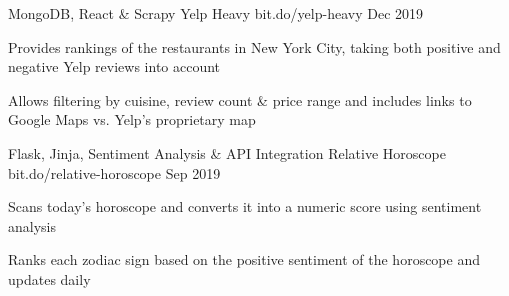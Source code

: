 

\begin{cventries}

 \cventry
    {MongoDB, React \& Scrapy} %
    {Yelp Heavy} %
    {bit.do/yelp-heavy} %
    {Dec 2019} %
    {
      \begin{cvitems} %
        \item {Provides rankings of the restaurants in New York City, taking both positive and negative Yelp reviews into account}
        \item {Allows filtering by cuisine, review count \& price range and includes links to Google Maps vs. Yelp's proprietary map}
      \end{cvitems}
    }

 \cventry
    {Flask, Jinja, Sentiment Analysis \& API Integration} %
    {Relative Horoscope} %
    {bit.do/relative-horoscope} %
    {Sep 2019} %
    {
      \begin{cvitems} %
        \item {Scans today's horoscope and converts it into a numeric score using sentiment analysis}
        \item {Ranks each zodiac sign based on the positive sentiment of the horoscope and updates daily}
      \end{cvitems}
    }

\end{cventries}
